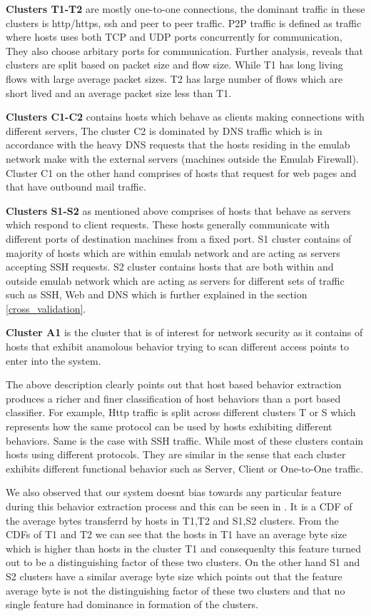 \textbf{Clusters T1-T2} are mostly one-to-one connections, the dominant traffic in these clusters is http/https, ssh and peer to peer traffic. P2P traffic is defined as traffic where hosts uses both TCP and UDP ports concurrently for communication, They also choose arbitary ports for communication. Further analysis, reveals that clusters are split based on packet size and flow size.
While T1 has long living flows with large average packet sizes. T2 has large number of flows which are short lived and an average packet size less than T1.

\textbf{Clusters C1-C2} contains hosts which behave as clients  making connections with different servers, The cluster C2 is dominated by DNS traffic which is in accordance with the heavy DNS requests that the hosts residing in the emulab network make with the external servers (machines outside the Emulab Firewall). Cluster C1 on the other hand comprises of hosts that request for web pages and that have outbound mail traffic.

\textbf{Clusters S1-S2} as mentioned above comprises of hosts that behave as servers which respond to client requests. These hosts generally communicate with different ports of destination machines from a fixed port. S1 cluster contains of majority of hosts which are within emulab network and are acting as servers accepting SSH requests. S2 cluster contains hosts that are both within and outside emulab network which are acting as servers for different sets of traffic such as SSH, Web and DNS which is further explained in the section \ref{cross_validation}. 

\textbf{Cluster A1} is the cluster that is of interest for network security as it contains of hosts that exhibit anamolous behavior trying to scan different access points to enter into the system.

The above description clearly points out that host based behavior extraction produces a richer and finer classification of host behaviors than a port based classifier. For example, Http traffic is split across different clusters T or S which represents how the same protocol can be used by hosts exhibiting different behaviors. Same is the case with SSH traffic. While most of these clusters contain hosts using different protocols. They are similar in the sense that each cluster exhibits different functional behavior such as Server, Client or One-to-One traffic.

We also observed that our system doesnt bias towards any particular feature during this behavior extraction process and this can be seen in . It is a CDF of the average bytes transferrd by hosts in T1,T2 and S1,S2 clusters. From the CDFs of T1 and T2 we can see that the hosts in T1 have an average byte size which is higher than hosts in the cluster T1 and consequenlty this feature turned out to be a distinguishing factor of these two clusters. On the other hand S1 and S2 clusters have a similar average byte size which points out that the feature average byte is not the distinguishing factor of these two clusters and that no single feature had dominance in formation of the clusters.

